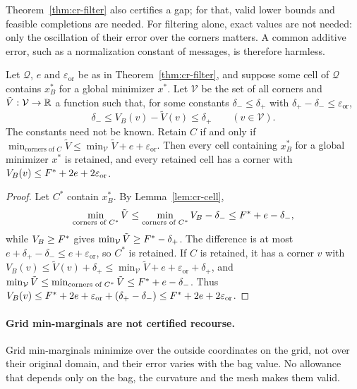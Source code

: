 Theorem~\ref{thm:cr-filter} also certifies a gap; for that, valid lower
bounds and feasible completions are needed. For filtering alone, exact
values are not needed: only the oscillation of their error over the corners
matters. A common additive error, such as a normalization constant of
messages, is therefore harmless.

\begin{proposition}\label{prop:cr-osc}
Let $\mathcal Q$, $e$ and $\varepsilon_{\mathrm{or}}$ be as in Theorem~\ref{thm:cr-filter}, and
suppose some cell of $\mathcal Q$ contains $x^*_B$ for a global minimizer
$x^*$. Let $\mathcal V$ be the set of all corners and
$\tilde V:\mathcal V\to\mathbb R$ a function such that, for some constants
$\delta_-\le\delta_+$ with $\delta_+-\delta_-\le\varepsilon_{\mathrm{or}}$,
\[
\delta_-\le V_B(v)-\tilde V(v)\le\delta_+\qquad(v\in\mathcal V).
\]
The constants need not be known. Retain $C$ if and only if
$\min_{\text{corners of }C}\tilde V\le\min_{\mathcal V}\tilde V+e+\varepsilon_{\mathrm{or}}$.
Then every cell containing $x^*_B$ for a global minimizer $x^*$ is
retained, and every retained cell has a corner with
$V_B(v)\le F^{*}+2e+2\varepsilon_{\mathrm{or}}$.
\end{proposition}

\begin{proof}
Let $C^*$ contain $x^*_B$. By Lemma~\ref{lem:cr-cell},
\[
\min_{\text{corners of }C^*}\tilde V\le\min_{\text{corners of }C^*}V_B-\delta_-
\le F^{*}+e-\delta_-,
\]
while $V_B\ge F^{*}$ gives $\min_{\mathcal V}\tilde V\ge F^{*}-\delta_+$. The
difference is at most $e+\delta_+-\delta_-\le e+\varepsilon_{\mathrm{or}}$, so $C^*$ is retained.
If $C$ is retained, it has a corner $v$ with
$V_B(v)\le\tilde V(v)+\delta_+\le\min_{\mathcal V}\tilde V+e+\varepsilon_{\mathrm{or}}+\delta_+$, and
$\min_{\mathcal V}\tilde V\le\min_{\text{corners of }C^*}\tilde V\le F^{*}+e-\delta_-$.
Thus $V_B(v)\le F^{*}+2e+\varepsilon_{\mathrm{or}}+(\delta_+-\delta_-)\le F^{*}+2e+2\varepsilon_{\mathrm{or}}$.
\end{proof}

\paragraph{Grid min-marginals are not certified recourse.}
Grid min-marginals minimize over the outside coordinates on the grid, not
over their original domain, and their error varies with the bag value. No
allowance that depends only on the bag, the curvature and the mesh makes
them valid.

